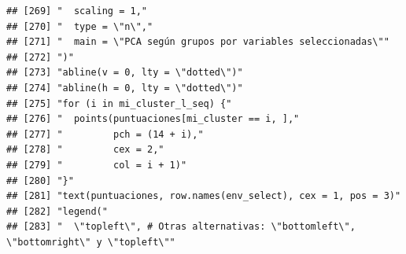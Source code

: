 \documentclass[11pt,]{article}
\begin{document}
\begin{verbatim}
## [269] "  scaling = 1,"                                                                                                                                                        
## [270] "  type = \"n\","                                                                                                                                                       
## [271] "  main = \"PCA según grupos por variables seleccionadas\""                                                                                                             
## [272] ")"                                                                                                                                                                     
## [273] "abline(v = 0, lty = \"dotted\")"                                                                                                                                       
## [274] "abline(h = 0, lty = \"dotted\")"                                                                                                                                       
## [275] "for (i in mi_cluster_l_seq) {"                                                                                                                                         
## [276] "  points(puntuaciones[mi_cluster == i, ],"                                                                                                                             
## [277] "         pch = (14 + i),"                                                                                                                                              
## [278] "         cex = 2,"                                                                                                                                                     
## [279] "         col = i + 1)"                                                                                                                                                 
## [280] "}"                                                                                                                                                                     
## [281] "text(puntuaciones, row.names(env_select), cex = 1, pos = 3)"                                                                                                           
## [282] "legend("                                                                                                                                                               
## [283] "  \"topleft\", # Otras alternativas: \"bottomleft\", \"bottomright\" y \"topleft\""                                                                                    

\end{verbatim}
\end{document}
